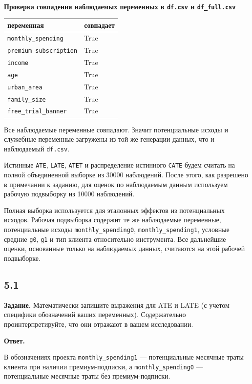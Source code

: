 \documentclass[11pt]{article}
\newcounter{none}
\begin{document}
    \textbf{Проверка совпадения наблюдаемых переменных в \texttt{df.csv} и
\texttt{df\_full.csv}}

{\def\LTcaptype{none} %
\begin{longtable}[]{@{}ll@{}}
\toprule\noalign{}
переменная & совпадает \\
\midrule\noalign{}
\endhead
\bottomrule\noalign{}
\endlastfoot
\texttt{monthly\_spending} & True \\
\texttt{premium\_subscription} & True \\
\texttt{income} & True \\
\texttt{age} & True \\
\texttt{urban\_area} & True \\
\texttt{family\_size} & True \\
\texttt{free\_trial\_banner} & True \\
\end{longtable}
}

    Все наблюдаемые переменные совпадают. Значит потенциальные исходы и
служебные переменные загружены из той же генерации данных, что и
наблюдаемый \texttt{df.csv}.

Истинные \texttt{ATE}, \texttt{LATE}, \texttt{ATET} и распределение
истинного \texttt{CATE} будем считать на полной объединенной выборке из
30000 наблюдений. После этого, как разрешено в примечании к заданию, для
оценок по наблюдаемым данным используем рабочую подвыборку из 10000
наблюдений.

    Полная выборка используется для эталонных эффектов из потенциальных
исходов. Рабочая подвыборка содержит те же наблюдаемые переменные,
потенциальные исходы \texttt{monthly\_spending0},
\texttt{monthly\_spending1}, условные средние \texttt{g0}, \texttt{g1} и
тип клиента относительно инструмента. Все дальнейшие оценки, основанные
только на наблюдаемых данных, считаются на этой рабочей подвыборке.

    \subsection{5.1}\label{section}

\textbf{Задание.} Математически запишите выражения для ATE и LATE (с
учетом специфики обозначений ваших переменных). Содержательно
проинтерпретируйте, что они отражают в вашем исследовании.

\textbf{Ответ.}

В обозначениях проекта \texttt{monthly\_spending1} --- потенциальные
месячные траты клиента при наличии премиум-подписки, а
\texttt{monthly\_spending0} --- потенциальные месячные траты без
премиум-подписки.
\end{document}
